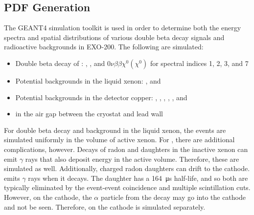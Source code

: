\documentclass[herrin-thesis.tex]{subfiles}
\begin{document}
\subsection{PDF Generation}

The GEANT4 simulation toolkit\cite{Agostinelli:2003fk} is used in order to determine both the energy spectra and spatial distributions of various double beta decay signals and radioactive backgrounds in EXO-200. The following are simulated:
\begin{itemize}
\item Double beta decay of :
	\twonu{},
	\zeronu{},
	and \(0\nu\beta\beta\chi^{0}(\chi^{0})\) for spectral indices 1, 2, 3, and 7
\item Potential backgrounds in the liquid xenon:
	,
	and 
\item Potential backgrounds in the detector copper:
	, 
	,
	,
	,
	,
	and 
\item {} in the air gap between the cryostat and lead wall
\end{itemize}

For double beta decay and background in the liquid xenon, the events are simulated uniformly in the volume of active xenon. For , there are additional complications, however. Decays of radon and daughters in the inactive xenon can emit \(\gamma\) rays that also deposit energy in the active volume. Therefore, these are simulated as well. Additionally, charged radon daughters can drift to the cathode.  emits \(\gamma\) rays when it decays. The daughter  has a \SI{164}{\micro\s} half-life, and so both are typically eliminated by the event-event coincidence and multiple scintillation cuts. However, on the cathode, the \(\alpha\) particle from the  decay may go into the cathode and not be seen. Therefore,  on the cathode is simulated separately.


	
\end{document}
